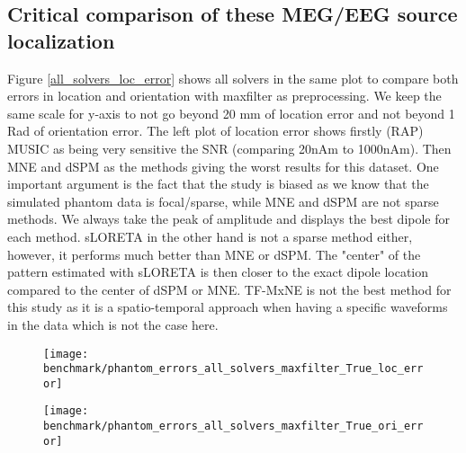 \subsection{Critical comparison of these MEG/EEG source localization}
Figure \ref{all_solvers_loc_error} shows all solvers in the same plot to compare both errors in location and orientation with maxfilter as preprocessing. We keep the same scale for y-axis to not go beyond 20 mm of location error and not beyond 1 Rad of orientation error. The left plot of location error shows firstly (RAP) MUSIC as being very sensitive the SNR (comparing 20nAm to 1000nAm). Then MNE and dSPM as the methods giving the worst results for this dataset. One important argument is the fact that the study is biased as we know that the simulated phantom data is focal/sparse, while MNE and dSPM are not sparse methods. We always take the peak of amplitude and displays the best dipole for each method. sLORETA in the other hand is not a sparse method either, however, it performs much better than MNE or dSPM. The "center" of the pattern estimated with sLORETA is then closer to the exact dipole location compared to the center of dSPM or MNE. TF-MxNE is not the best method for this study as it is a spatio-temporal approach when having a specific waveforms in the data which is not the case here.

\begin{sidewaysfigure}[ht]
        \centering
        \begin{subfigure}[b]{0.47\textwidth}
            \centering
            \texttt{[image: benchmark/phantom\_errors\_all\_solvers\_maxfilter\_True\_loc\_error]}
            \label{fig:all_solvers_loc_error}
        \end{subfigure}
		\hspace{25pt}
        \begin{subfigure}[b]{0.47\textwidth}  
            \centering 
            \texttt{[image: benchmark/phantom\_errors\_all\_solvers\_maxfilter\_True\_ori\_error]}
            \label{fig:all_solvers_ori_error}
        \end{subfigure}

		\caption{Comparison of the position and the orientation error between most of the solvers for 4 different dipoles.\label{all_solvers_loc_error}}
\end{sidewaysfigure}

